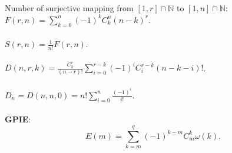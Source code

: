 \documentclass[12pt]{article}
\begin{document}
\begin{multicols}{3}
        \\\\
        Number of surjective mapping from $[1, r] \cap \mathbb{N}$ to $[1, n] \cap \mathbb{N}$: $F(r, n) = \sum_{k = 0}^{n}(-1)^kC^n_k(n - k)^r$.
        \\\\
        $S(r, n) = \frac{1}{n!}F(r, n)$.
        \\\\
        $D(n, r, k) = \frac{C^r_k}{(n - r)!}\sum_{i = 0}^{r - k}(-1)^iC^{r - k}_i(n - k - i)!$.
        \\\\
        $D_n = D(n, n, 0) = n!\sum_{i = 0}^{n}\frac{(-1)^i}{i!}$.
        \\\\
        \textbf{GPIE}: 
        \begin{equation*}
            E(m) = \sum_{k = m}^{q}(-1)^{k - m}C^k_m\omega(k).
        \end{equation*}
    \end{multicols}
\end{document}
